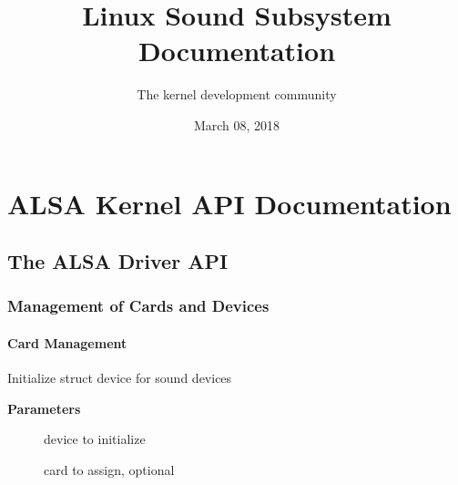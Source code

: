 \documentclass[a4paper,8pt,english]{sphinxmanual}
\title{Linux Sound Subsystem Documentation}
\date{March 08, 2018}
\author{The kernel development community}
\begin{document}
\maketitle
\tableofcontents
{}\label{sound/index::doc}



\chapter{ALSA Kernel API Documentation}
\label{sound/kernel-api/index:linux-sound-subsystem-documentation}\label{sound/kernel-api/index:alsa-kernel-api-documentation}\label{sound/kernel-api/index::doc}

\section{The ALSA Driver API}
\label{sound/kernel-api/alsa-driver-api:the-alsa-driver-api}\label{sound/kernel-api/alsa-driver-api::doc}

\subsection{Management of Cards and Devices}
\label{sound/kernel-api/alsa-driver-api:management-of-cards-and-devices}

\subsubsection{Card Management}
\label{sound/kernel-api/alsa-driver-api:card-management}

\begin{fulllineitems}
\label{sound/kernel-api/alsa-driver-api:c.snd_device_initialize}
Initialize struct device for sound devices

\end{fulllineitems}


\textbf{Parameters}
\begin{description}
\item[{}] \leavevmode
device to initialize

\item[{}] \leavevmode
card to assign, optional

\end{description}
\end{document}
